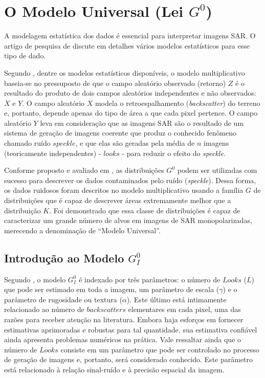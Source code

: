 \documentclass[12pt]{article}
\begin{document}
\section{O Modelo Universal (Lei $G^{0}$)}

A modelagem estatística dos dados é essencial para interpretar imagens SAR. O artigo de pesquisa de \citet{Gao2010StatisticalMO} discute em detalhes vários modelos estatísticos para esse tipo de dado.

Segundo \citet{Mejail2002}, dentre os modelos estatísticos disponíveis, o modelo multiplicativo baseia-se no pressuposto de que o campo aleatório observado (retorno) $Z$ é o resultado do produto de dois campos aleatórios independentes e não observados: $X$ e $Y$. O campo aleatório $X$ modela o retroespalhamento (\textit{backscatter})  do terreno e, portanto, depende apenas do tipo de área a que cada pixel pertence. O campo aleatório $Y$ leva em consideração que as imagens SAR são o resultado de um sistema de geração de imagens coerente que produz o conhecido fenômeno chamado ruído $speckle$, e que elas são geradas pela média de $n$ imagens (teoricamente independentes) - $looks$ - para reduzir o efeito do \textit{speckle}.

Conforme proposto e avaliado em \citet{Clutter1997}, as distribuições $G^0$ podem ser utilizadas com sucesso para descrever os dados contaminados pelo ruído (\textit{speckle}). Dessa forma, os dados ruidosos foram descritos no modelo multiplicativo usando a família $G$ de distribuições que é capaz de descrever áreas extremamente  melhor que a distribuição $K$. Foi demonstrado que essa classe de distribuições é capaz de caracterizar um grande número de alvos em imagens de SAR monopolarizadas, merecendo a denominação de “Modelo Universal”. 

\subsection{Introdução ao Modelo $G_I^0$}

Segundo \citet{FreryStochasticDistances2015}, o modelo $G_I^0$ é indexado por três parâmetros: o número de $Looks$ ($L$) que pode ser estimado em toda a imagem, um parâmetro de escala ($\gamma$) e o parâmetro de rugosidade ou textura ($\alpha$). Este último está intimamente relacionado ao número de $backscatters$ elementares em cada pixel, uma das razões para receber atenção na literatura. Embora haja esforços em fornecer estimativas aprimoradas e robustas para tal quantidade, sua estimativa confiável ainda apresenta problemas numéricos na prática. Vale ressaltar ainda que o número de $Looks$ consiste em um parâmetro que pode ser controlado no processo de geração de imagens e, portanto, será considerado conhecido. Este parâmetro está relacionado à relação sinal-ruído e à precisão espacial da imagem.
\end{document}
